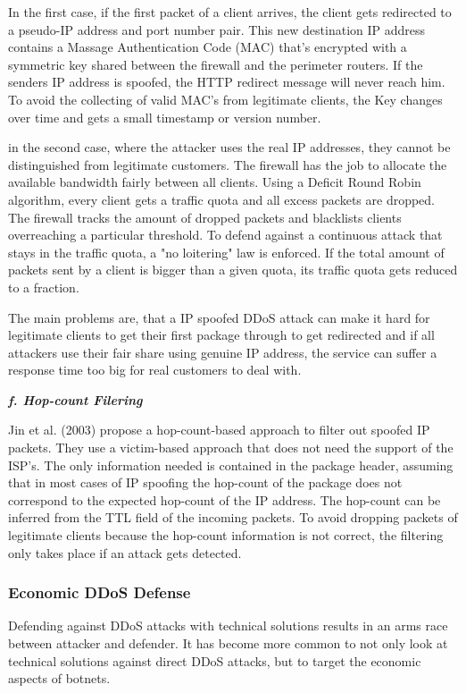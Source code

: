 In the first case, if the first packet of a client arrives, the client gets redirected to a pseudo-IP address and port number pair.
This new destination IP address contains a Massage Authentication Code (MAC) that's encrypted with a symmetric key shared between the firewall and the perimeter routers.
If the senders IP address is spoofed, the HTTP redirect message will never reach him.
To avoid the collecting of valid MAC's from legitimate clients, the Key changes over time and gets a small timestamp or version number.\cite{Xu03}

in the second case, where the attacker uses the real IP addresses, they cannot be distinguished from legitimate customers.
The firewall has the job to allocate the available bandwidth fairly between all clients.
Using a Deficit Round Robin algorithm, every client gets a traffic quota and all excess packets are dropped.
The firewall tracks the amount of dropped packets and blacklists clients overreaching a particular threshold.
To defend against a continuous attack that stays in the traffic quota, a "no loitering" law is enforced.
If the total amount of packets sent by a client is bigger than a given quota, its traffic quota gets reduced to a fraction.\cite{Xu03}

The main problems are, that a IP spoofed DDoS attack can make it hard for legitimate clients to get their first package through to get redirected and if all attackers use their fair share using genuine IP address, the service can suffer a response time too big for real customers to deal with.\cite{Xu03}

\textbf{\textit{f. Hop-count Filering}}

Jin et al. (2003) propose a hop-count-based approach to filter out spoofed IP packets.
They use a victim-based approach that does not need the support of the ISP's.
The only information needed is contained in the package header, assuming that in most cases of IP spoofing the hop-count of the package does not correspond to the expected hop-count of the IP address.
The hop-count can be inferred from the TTL field of the incoming packets.
To avoid dropping packets of legitimate clients because the hop-count information is not correct, the filtering only takes place if an attack gets detected.\cite{Jin03}

\subsubsection{Economic DDoS Defense}
Defending against DDoS attacks with technical solutions results in an arms race between attacker and defender.
It has become more common to not only look at technical solutions against direct DDoS attacks, but to target the economic aspects of botnets.

